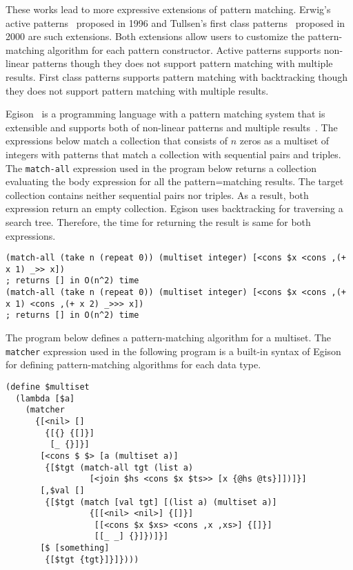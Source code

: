 \documentclass[acmlarge]{acmart}
\begin{document}
These works lead to more expressive extensions of pattern matching.
Erwig's active patterns~\cite{erwig1996active} proposed in 1996 and Tullsen's first class patterns~\cite{tullsen2000first} proposed in 2000 are such extensions.
Both extensions allow users to customize the pattern-matching algorithm for each pattern constructor.
Active patterns supports non-linear patterns though they does not support pattern matching with multiple results.
First class patterns supports pattern matching with backtracking though they does not support pattern matching with multiple results.

Egison~\cite{egisonWeb} is a programming language with a pattern matching system that is extensible and supports both of non-linear patterns and multiple results~\cite{egi2018aplas}.
The expressions below match a collection that consists of $n$ zeros as a multiset of integers with patterns that match a collection with sequential pairs and triples.
The \texttt{match-all} expression used in the program below returns a collection evaluating the body expression for all the pattern=matching results.
The target collection contains neither sequential pairs nor triples.
As a result, both expression return an empty collection.
Egison uses backtracking for traversing a search tree.
Therefore, the time for returning the result is same for both expressions.

\begin{lstlisting}[language=egison]
(match-all (take n (repeat 0)) (multiset integer) [<cons $x <cons ,(+ x 1) _>> x])
; returns [] in O(n^2) time
(match-all (take n (repeat 0)) (multiset integer) [<cons $x <cons ,(+ x 1) <cons ,(+ x 2) _>>> x])
; returns [] in O(n^2) time
\end{lstlisting}

\noindent The program below defines a pattern-matching algorithm for a multiset.
The \texttt{matcher} expression used in the following program is a built-in syntax of Egison for defining pattern-matching algorithms for each data type.

\begin{lstlisting}[language=egison]
(define $multiset
  (lambda [$a]
    (matcher
      {[<nil> []
        {[{} {[]}]
         [_ {}]}]
       [<cons $ $> [a (multiset a)]
        {[$tgt (match-all tgt (list a)
                 [<join $hs <cons $x $ts>> [x {@hs @ts}]])]}]
       [,$val []
        {[$tgt (match [val tgt] [(list a) (multiset a)]
                 {[[<nil> <nil>] {[]}]
                  [[<cons $x $xs> <cons ,x ,xs>] {[]}]
                  [[_ _] {}]})]}]
       [$ [something]
        {[$tgt {tgt}]}]})))
\end{lstlisting}
\end{document}
